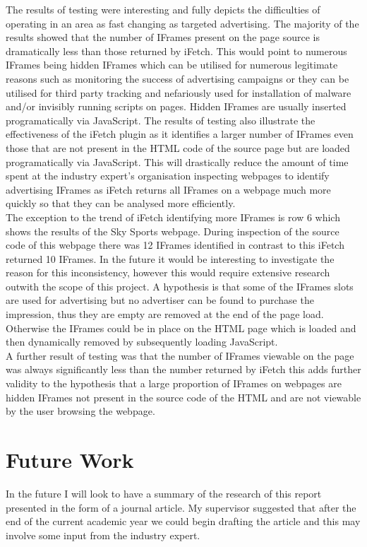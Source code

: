 \documentclass[12pt]{article}
\begin{document}
The results of testing were interesting and fully depicts the difficulties of operating in an area as fast changing as targeted advertising. The majority of the results showed that the number of IFrames present on the page source is dramatically less than those returned by iFetch. This would point to numerous IFrames being hidden IFrames which can be utilised for numerous legitimate reasons such as monitoring the success of advertising campaigns or they can be utilised for third party tracking and nefariously used for installation of malware and/or invisibly running scripts on pages. Hidden IFrames are usually inserted programatically via JavaScript. The results of testing also illustrate the effectiveness of the iFetch plugin as it identifies a larger number of IFrames even those that are not present in the HTML code of the source page but are loaded programatically via JavaScript. This will drastically reduce the amount of time spent at the industry expert's organisation inspecting webpages to identify advertising IFrames as iFetch returns all IFrames on a webpage much more quickly so that they can be analysed more efficiently.  \\  

The exception to the trend of iFetch identifying more IFrames is row 6 which shows the results of the Sky Sports webpage. During inspection of the source code of this webpage there was 12 IFrames identified in contrast to this iFetch returned 10 IFrames. In the future it would be interesting to investigate the reason for this inconsistency, however this would require extensive research outwith the scope of this project. A hypothesis is that some of the IFrames slots are used for advertising but no advertiser can be found to purchase the impression, thus they are empty are removed at the end of the page load. Otherwise the IFrames could be in place on the HTML page which is loaded and then dynamically removed by subsequently loading JavaScript. \\ 

A further result of testing was that the number of IFrames viewable on the page was always significantly less than the number returned by iFetch this adds further validity to the hypothesis that a large proportion of IFrames on webpages are hidden IFrames not present in the source code of the HTML and are not viewable by the user browsing the webpage.

\pagebreak

\section{Future Work} \label{futureWork}
In the future I will look to have a summary of the research of this report presented in the form of a journal article. My supervisor suggested that after the end of the current academic year we could begin drafting the article and this may involve some input from the industry expert. \\
\end{document}
